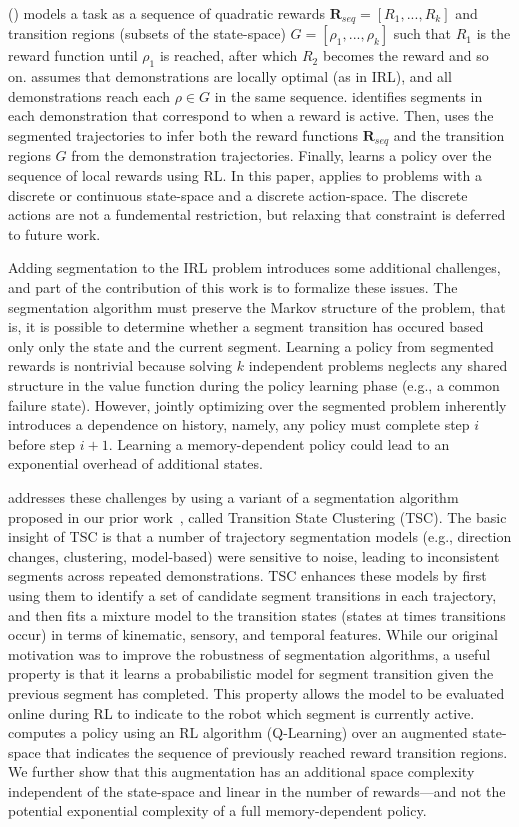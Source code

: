 \hirlfull (\hirl) models a task as a sequence of quadratic rewards $\mathbf{R}_{seq}=[R_1,...,R_k]$ and transition regions (subsets of the state-space) $G = [\rho_1, ...,\rho_k]$ such that $R_1$ is the reward function until $\rho_1$ is reached, after which $R_2$ becomes the reward and so on.
\hirl assumes that demonstrations are locally optimal (as in IRL), and all demonstrations reach each $\rho \in G$ in the same sequence.
\hirl identifies segments in each demonstration that correspond to when a reward is active.
Then, \hirl uses the segmented trajectories to infer both the reward functions $\mathbf{R}_{seq}$ and the transition regions $G$ from the demonstration trajectories.
Finally, \hirl learns a policy over the sequence of local rewards using RL.
In this paper, \hirl applies to problems with a discrete or continuous state-space and a discrete action-space.
The discrete actions are not a fundemental restriction, but relaxing that constraint is deferred to future work.

Adding segmentation to the IRL problem introduces some additional challenges, and part of the contribution of this work is to formalize these issues.
The segmentation algorithm must preserve the Markov structure of the problem, that is, it is possible to determine whether a segment transition has occured based only only the state and the current segment.
Learning a policy from segmented rewards is nontrivial because solving $k$ independent problems neglects any shared structure in the value function during the policy learning phase (e.g., a common failure state).
However, jointly optimizing over the segmented problem inherently introduces a dependence on history, namely, any policy must complete step $i$ before step $i+1$.
Learning a memory-dependent policy could lead to an exponential overhead of additional states. 

\hirl addresses these challenges by using a variant of a segmentation algorithm proposed in our prior work~\cite{krishnan2015tsc,murali2016}, called Transition State Clustering (TSC). The basic insight of TSC is that a number of trajectory segmentation models (e.g., direction changes, clustering, model-based) were sensitive to noise, leading to inconsistent segments across repeated demonstrations.
TSC enhances these models by first using them to identify a set of candidate segment transitions in each trajectory, and then fits a mixture model to the transition states (states at times transitions occur) in terms of kinematic, sensory, and temporal features. 
While our original motivation was to improve the robustness of segmentation algorithms, a useful property is that it learns a probabilistic model for segment transition given the previous segment has completed.
This property allows the model to be evaluated online during RL to indicate to the robot which segment is currently active.
\hirl computes a policy using an RL algorithm (Q-Learning) over an augmented state-space that indicates the sequence of previously reached reward transition regions. We further show that this augmentation has an additional space complexity independent of the state-space and linear in the number of rewards---and not the potential exponential complexity of a full memory-dependent policy.


